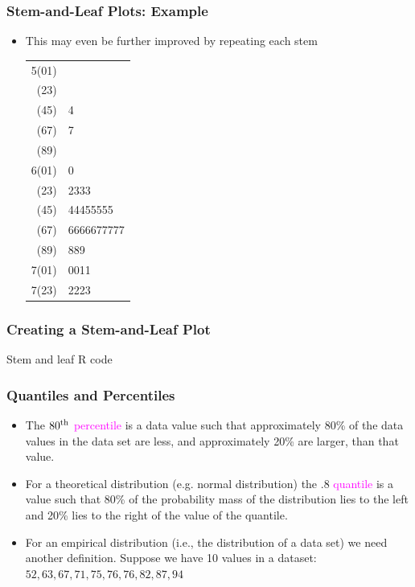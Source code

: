 \documentclass[xcolor=dvipsnames,12pt]{beamer}
\begin{document}
\begin{frame}
\frametitle{Stem-and-Leaf Plots: Example}
\begin{itemize}
\item This may even be further improved by repeating each stem 
{\small
\begin{center}
\begin{tabular}{r|l}
                   5(01)& \\
                    (23)& \\
                    (45)& 4\\
                    (67)& 7\\
                    (89)& \\
                   6(01)& 0\\
                    (23)& 2333\\
                    (45)& 44455555\\
                    (67)& 6666677777\\
                    (89)& 889\\
                   7(01)& 0011\\
                   7(23)& 2223
\end{tabular}
\end{center}}
\end{itemize}
\end{frame}

\begin{frame}
\frametitle{Creating a Stem-and-Leaf Plot}
Stem and leaf R code
\end{frame}



\begin{frame}
\frametitle{Quantiles and Percentiles}
\begin{itemize}
\item The $80^{\rm th}$ \textcolor{magenta}{percentile} is a data value such
that approximately 80\% of the data values in the data set are 
less, and approximately 20\% are larger,  than that value.
\item  For a theoretical distribution (e.g. normal distribution) the
.8 \textcolor{magenta}{quantile}  is a value such that 80\% of the probability mass 
of the distribution lies to the left and 20\% lies to the right
of the value of the quantile.
\item  For an empirical distribution (i.e., the distribution of a data
set) we need another definition. Suppose we have  10 values in a
dataset:\ $52, 63, 67, 71, 75, 76, 76, 82, 87, 94$
\end{itemize}
\end{frame}
\end{document}
